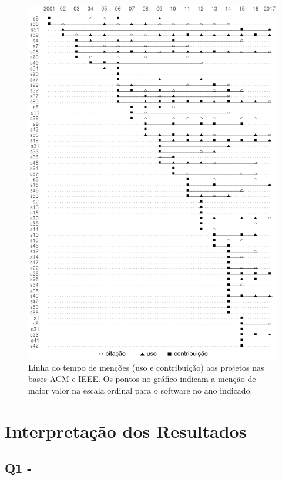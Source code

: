 \begin{figure}[h]
  \center
  \includegraphics[scale=0.6]{imagens/mentions-timeline.png}
  \caption{Linha do tempo de menções (uso e contribuição) aos projetos nas bases ACM e IEEE.
           Os pontos no gráfico indicam a menção de maior valor na escala ordinal para o software no ano indicado.}
  \label{mentions-timeline}
\end{figure}


\section{Interpretação dos Resultados} \label{estudo2:interpretacao} %

\subsection{Q1 - \EstudoDoisQuestaoUm}

